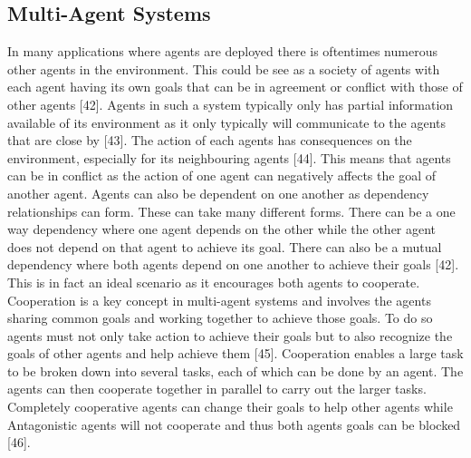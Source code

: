 \documentclass[oneside,12pt]{Classes/RoboticsLaTeX}
\begin{document}
\subsection{Multi-Agent Systems}
In many applications where agents are deployed there is oftentimes numerous other agents in the environment. This could be see as a society of agents with each agent having its own goals that can be in agreement or conflict with those of other agents [42]. Agents in such a system typically only has partial information available of its environment as it only typically will communicate to the agents that are close by [43]. The action of each agents has consequences on the environment, especially for its neighbouring agents [44]. This means that agents can be in conflict as the action of one agent can negatively affects the goal of another agent. Agents can also be dependent on one another as dependency relationships can form. These can take many different forms. There can be a one way dependency where one agent depends on the other while the other agent does not depend on that agent to achieve its goal. There can also be a mutual dependency where both agents depend on one another to achieve their goals [42]. This is in fact an ideal scenario as it encourages both agents to cooperate. Cooperation is a key concept in multi-agent systems and involves the agents sharing common goals and working together to achieve those goals. To do so agents must not only take action to achieve their goals but to also recognize the goals of other agents and help achieve them [45]. Cooperation enables a large task to be broken down into several tasks, each of which can be done by an agent. The agents can then cooperate together in parallel to carry out the larger tasks. Completely cooperative agents can change their goals to help other agents while Antagonistic agents will not cooperate and thus both agents goals can be blocked [46]. 
\end{document}

